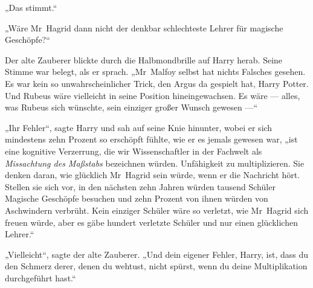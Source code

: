 „Das stimmt.“

„Wäre Mr~Hagrid dann nicht der denkbar schlechteste Lehrer für magische Geschöpfe?“

Der alte Zauberer blickte durch die Halbmondbrille auf Harry herab. Seine Stimme war belegt, als er sprach.
„Mr~Malfoy selbst hat nichts Falsches gesehen. Es war kein so unwahrscheinlicher Trick, den Argus da gespielt hat, Harry Potter. Und Rubeus wäre vielleicht in seine Position hineingewachsen. Es wäre — alles, was Rubeus sich wünschte, sein einziger großer Wunsch gewesen —“

„Ihr Fehler“, sagte Harry und sah auf seine Knie hinunter, wobei er sich mindestens zehn Prozent so erschöpft fühlte, wie er es jemals gewesen war, „ist eine kognitive Verzerrung, die wir Wissenschaftler in der Fachwelt als \emph{Missachtung des Maßstabs} bezeichnen würden. Unfähigkeit zu multiplizieren. Sie denken daran, wie glücklich Mr~Hagrid sein würde, wenn er die Nachricht hört. Stellen sie sich vor, in den nächsten zehn Jahren würden tausend Schüler Magische Geschöpfe besuchen und zehn Prozent von ihnen würden von Aschwindern verbrüht. Kein einziger Schüler wäre so verletzt, wie Mr~Hagrid sich freuen würde, aber es gäbe hundert verletzte Schüler und nur einen glücklichen Lehrer.“

„Vielleicht“, sagte der alte Zauberer.
„Und dein eigener Fehler, Harry, ist, dass du den Schmerz derer, denen du wehtust, nicht spürst, wenn du deine Multiplikation durchgeführt hast.“

